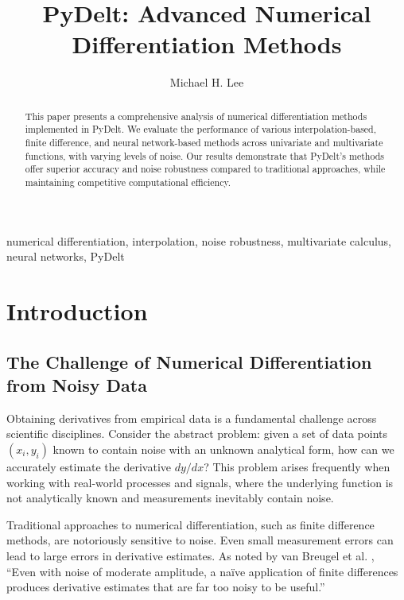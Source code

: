 \documentclass[10pt,journal,compsoc]{IEEEtran}
\begin{document}
\title{PyDelt: Advanced Numerical Differentiation Methods}

\author{Michael H. Lee}


\maketitle

\begin{abstract}
This paper presents a comprehensive analysis of numerical differentiation methods implemented in PyDelt. We evaluate the performance of various interpolation-based, finite difference, and neural network-based methods across univariate and multivariate functions, with varying levels of noise. Our results demonstrate that PyDelt's methods offer superior accuracy and noise robustness compared to traditional approaches, while maintaining competitive computational efficiency.
\end{abstract}

\begin{IEEEkeywords}
numerical differentiation, interpolation, noise robustness, multivariate calculus, neural networks, PyDelt
\end{IEEEkeywords}

\section{Introduction}

\subsection{The Challenge of Numerical Differentiation from Noisy Data}

Obtaining derivatives from empirical data is a fundamental challenge across scientific disciplines. Consider the abstract problem: given a set of data points $(x_i, y_i)$ known to contain noise with an unknown analytical form, how can we accurately estimate the derivative $dy/dx$? This problem arises frequently when working with real-world processes and signals, where the underlying function is not analytically known and measurements inevitably contain noise.

Traditional approaches to numerical differentiation, such as finite difference methods, are notoriously sensitive to noise. Even small measurement errors can lead to large errors in derivative estimates. As noted by van Breugel et al. \cite{van2021numerical}, ``Even with noise of moderate amplitude, a naïve application of finite differences produces derivative estimates that are far too noisy to be useful.''
\end{document}
